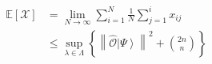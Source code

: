 \begin{align}\mathbb{E}\left[\mathcal{X}\right]&=\lim_{N\to\infty}\sum_{i=1}^{N}\frac{1}{N}\sum_{j=1}^{i}x_{ij}\\&\le\sup_{\lambda\in\Lambda}\left\{\left\|\hat{\mathcal{O}}\left|\Psi\right\rangle\right\|^2+\binom{2n}{n}\right\}\end{align}
